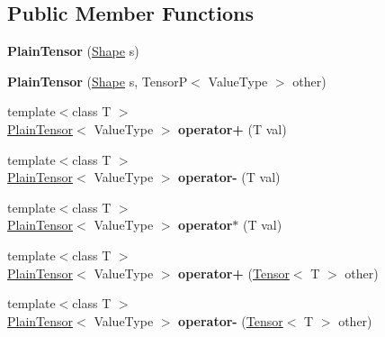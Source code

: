 \subsection*{Public Member Functions}
\begin{DoxyCompactItemize}
\item 
\mbox{\label{classPlainTensor_a1bb7b0b08b81c1a8c5229d3e74df566d}} 
{\bfseries Plain\+Tensor} (\hyperlink{classShape}{Shape} s)
\item 
\mbox{\label{classPlainTensor_ab70afe70caa153f1bcaa25b1f4c7b6db}} 
{\bfseries Plain\+Tensor} (\hyperlink{classShape}{Shape} s, TensorP$<$ Value\+Type $>$ other)
\item 
\mbox{\label{classPlainTensor_ad93424e2501cbc3e0c8c7e5966df4eba}} 
{\footnotesize template$<$class T $>$ }\\\hyperlink{classPlainTensor}{Plain\+Tensor}$<$ Value\+Type $>$ {\bfseries operator+} (T val)
\item 
\mbox{\label{classPlainTensor_aac41de476f267e19a4264ddf7fd3a1dd}} 
{\footnotesize template$<$class T $>$ }\\\hyperlink{classPlainTensor}{Plain\+Tensor}$<$ Value\+Type $>$ {\bfseries operator-\/} (T val)
\item 
\mbox{\label{classPlainTensor_a48a3bcd32cda8ef59f423753ef48309c}} 
{\footnotesize template$<$class T $>$ }\\\hyperlink{classPlainTensor}{Plain\+Tensor}$<$ Value\+Type $>$ {\bfseries operator$\ast$} (T val)
\item 
\mbox{\label{classPlainTensor_ac8f9b34e18baaddf1f92e6d28975b316}} 
{\footnotesize template$<$class T $>$ }\\\hyperlink{classPlainTensor}{Plain\+Tensor}$<$ Value\+Type $>$ {\bfseries operator+} (\hyperlink{classTensor}{Tensor}$<$ T $>$ other)
\item 
\mbox{\label{classPlainTensor_adcf4707571654e929a390fa6315a072e}} 
{\footnotesize template$<$class T $>$ }\\\hyperlink{classPlainTensor}{Plain\+Tensor}$<$ Value\+Type $>$ {\bfseries operator-\/} (\hyperlink{classTensor}{Tensor}$<$ T $>$ other)

\end{DoxyCompactItemize}
